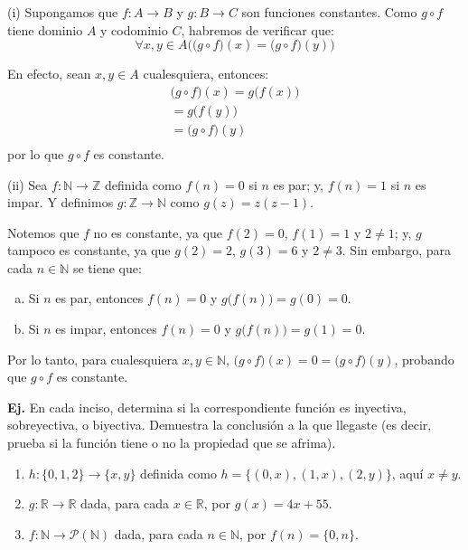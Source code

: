\documentclass[letterpaper,DIV=14,headsepline,12pt]{scrartcl}
\makeatletter
\newcounter{Ejer}
\newcommand{\pts}{}
\newenvironment{ejercicio}[1]{\noindent
    \ifthenelse{\equal{#1}{1} \OR \equal{#1}{+1}}{\renewcommand{\pts}{\textbf{(#1 pt)}}}{\renewcommand{\pts}{\textbf{(#1 pts)}}}\textbf{Ej. \theEjer} \pts\stepcounter{Ejer}}{\vspace{.3cm}}
\newenvironment{solucion}[1][]{%
        \par\pushQED{\hfill \lozenge}%
        \normalfont\topsep6pt \partopsep0pt %
        \trivlist
        \item[\hskip\labelsep
                \textbf{\textit{Solución.}}%
        ]#1
        }{%
        \popQED\endtrivlist\@endpefalse
    }
\makeatother
\begin{document}
   \begin{solucion}
        (i) Supongamos que $f:A \to B$ y $g:B \to C$ son funciones constantes. Como $g \circ f$ tiene dominio $A$ y codominio $C$, habremos de verificar que:
        \[ \forall x,y \in A \big( \big(g \circ f\big)(x) = \big(g \circ f\big)(y) \big) \]

        En efecto, sean $x,y \in A$ cualesquiera, entonces:
        \begin{align*}
            \big(g \circ f\big) (x) = g\big(f (x) \big) \tag*{Def. de composición} \\
            = g\big(f (y) \big) \tag*{$f$ es constante} \\
            = \big(g \circ f\big) (y) \tag*{Def. de composición} \\
        \end{align*}
        por lo que $g \circ f$ es constante.

        (ii) Sea $f:\mathbb{N} \to \mathbb{Z}$ definida como $f(n)=0$ si $n$ es par; y, $f(n)=1$ si $n$ es impar. Y definimos $g:\mathbb{Z} \to \mathbb{N}$ como $g(z)=z(z-1)$.

        Notemos que $f$ no es constante, ya que $f(2)=0$, $f(1)=1$ y $2 \neq 1$; y, $g$ tampoco es constante, ya que $g(2)=2$, $g(3)=6$ y $2 \neq 3$. Sin embargo, para cada $n \in \mathbb{N}$ se tiene que:
        \begin{enumerate}[a)]
            \item Si $n$ es par, entonces $f(n)=0$ y $g\big( f(n)\big)=g(0)=0$.
            \item Si $n$ es impar, entonces $f(n)=0$ y $g\big( f(n)\big)=g(1)=0$.
        \end{enumerate}
        
        Por lo tanto, para cualesquiera $x,y \in \mathbb{N}$, $\big(g \circ f\big) (x)=0=\big(g \circ f\big) (y)$, probando que $g \circ f$ es constante.
    \end{solucion}

    \begin{ejercicio}{2.5}
        En cada inciso, determina si la correspondiente función es inyectiva, sobreyectiva, o biyectiva. Demuestra la conclusión a la que llegaste (es decir, prueba si la función tiene o no la propiedad que se afrima).
        \begin{enumerate}
            \item $h:\{0,1,2\} \to \{x,y\}$ definida como $h=\{(0,x),(1,x),(2,y)\}$, aquí $x \neq y$.
            \item $g:\mathbb{R}\to \mathbb{R}$ dada, para cada $x \in \mathbb{R}$, por $g(x)=4x+55$.
            \item $f:\mathbb{N}\to \mathscr{P}(\mathbb{N})$ dada, para cada $n \in \mathbb{N}$, por $f(n)=\{0,n\}$.
        \end{enumerate}
    \end{ejercicio}
\end{document}
